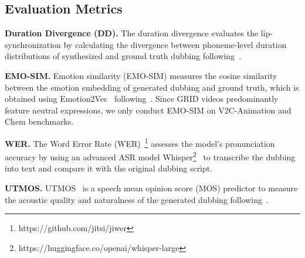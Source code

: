 \subsection{Evaluation Metrics}
\noindent \textbf{Duration Divergence (DD).}
The duration divergence evaluates the lip-synchronization by calculating the divergence between phoneme-level duration distributions of synthesized and ground truth dubbing following~\cite{flashspeech}.

\noindent \textbf{EMO-SIM.}
Emotion similarity (EMO-SIM) measures the cosine similarity between the emotion embedding of generated dubbing and ground truth, which is obtained using Emotion2Vec~\cite{emotion2vec} following~\cite{voicecraftdub}.
Since GRID videos predominantly feature neutral expressions, we only conduct EMO-SIM on V2C-Animation and Chem benchmarks.

\noindent \textbf{WER.}
The Word Error Rate (WER)~\footnote{https://github.com/jitsi/jiwer} assesses the model's pronunciation accuracy by using an advanced ASR model Whisper\footnote{https://huggingface.co/openai/whisper-large}~\cite{whisper} to transcribe the dubbing into text and compare it with the original dubbing script.

\noindent \textbf{UTMOS.}
UTMOS~\cite{utmos} is a speech mean opinion score (MOS) predictor to measure the acoustic quality and naturalness of the generated dubbing following~\cite{naturalspeech3}.







